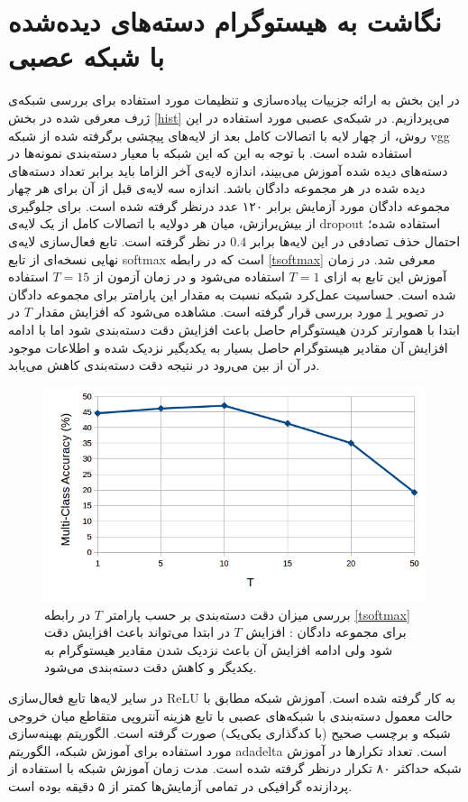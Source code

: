 \section{نگاشت به هیستوگرام دسته‌های دیده‌شده با شبکه عصبی}
در این بخش به ارائه جزییات پیاده‌سازی و تنظیمات مورد استفاده برای بررسی شبکه‌ی ژرف معرفی شده در بخش \ref{hist} می‌پردازیم.
 در شبکه‌ی عصبی مورد استفاده در این روش، از چهار لایه با اتصالات کامل بعد از لایه‌های پیچشی برگرفته شده از شبکه vgg استفاده شده است. با توجه به این که این شبکه با معیار دسته‌بندی نمونه‌ها در دسته‌های دیده شده آموزش می‌بیند،
 اندازه لایه‌ی آخر الزاما باید برابر تعداد دسته‌های دیده شده در هر مجموعه دادگان باشد. اندازه سه لایه‌ی قبل از آن برای هر چهار مجموعه‌ دادگان مورد آزمایش برابر ۱۲۰ عدد درنظر گرفته شده است. برای جلوگیری از بیش‌برازش، میان هر دولایه با اتصالات کامل از یک لایه‌ی \gls{dropout} \cite{dropout} استفاده شده؛ احتمال حذف تصادفی در این لایه‌ها برابر $0.4$ در نظر گرفته است.
 تابع فعال‌سازی لایه‌ی نهایی نسخه‌ای از تابع softmax است که در رابطه \eqref{tsoftmax} معرفی شد. در زمان آموزش این تابع به ازای $T=1$ استفاده می‌شود و در زمان آزمون از $T=15$ استفاده شده است. حساسیت عمل‌کرد شبکه نسبت به مقدار این پارامتر برای مجموعه دادگان  در تصویر \ref{hist_param} مورد بررسی قرار گرفته است. مشاهده می‌شود که افزایش مقدار $T$ در ابتدا با هموارتر کردن هیستوگرام حاصل باعث افزایش دقت دسته‌بندی شود اما با ادامه افزایش آن مقادیر هیستوگرام حاصل بسیار به یکدیگیر نزدیک شده و اطلاعات موجود در آن از بین می‌رود در نتیجه دقت دسته‌بندی کاهش می‌یابد.
 \begin{figure}[!t]
\centering
\includegraphics[width=0.85\linewidth]{images/hist_param}
\caption[بررسی تاثیر پارامترهای روش نگاشت به هیستوگرام با شبکه عصبی]{
بررسی میزان دقت دسته‌بندی بر حسب پارامتر $T$ در رابطه \eqref{tsoftmax} برای مجموعه دادگان : افزایش $T$ در ابتدا می‌تواند باعث افزایش دقت شود ولی ادامه افزایش آن باعث نزدیک شدن مقادیر هیستوگرام به یکدیگر و کاهش دقت دسته‌بندی می‌شود.
}
\label{hist_param}
\end{figure}
در سایر لایه‌ها تابع فعال‌سازی ReLU به کار گرفته شده است. آموزش شبکه مطابق با حالت معمول دسته‌بندی با شبکه‌های عصبی  با تابع هزینه آنتروپی متقاطع میان خروجی شبکه و  برچسب صحیح (با کدگذاری یکی‌یک) صورت گرفته است. الگوریتم بهینه‌سازی مورد استفاده برای آموزش شبکه، الگوریتم adadelta \cite{adadelta} است. تعداد تکرارها در آموزش شبکه حداکثر ۸۰ تکرار درنظر گرفته شده است. مدت زمان آموزش شبکه با استفاده از پردازنده گرافیکی
در تمامی آزمایش‌ها کمتر از ۵ دقیقه بوده است.


